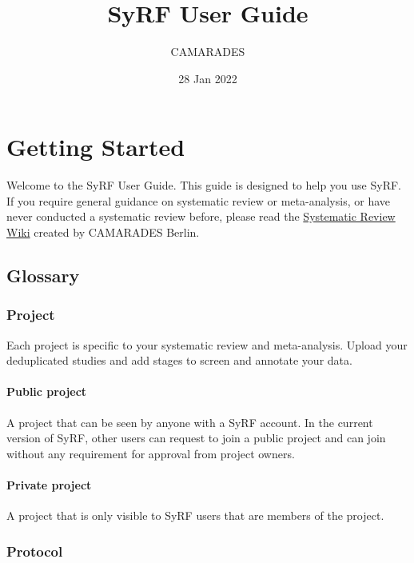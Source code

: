 \documentclass[
]{book}
\title{SyRF User Guide}
\author{CAMARADES}
\date{28 Jan 2022}
\begin{document}
\maketitle

{
\setcounter{tocdepth}{1}
\tableofcontents
}
\hypertarget{index}{%
\chapter{Getting Started}\label{index}}

Welcome to the SyRF User Guide. This guide is designed to help you use SyRF. If you require general guidance on systematic review or meta-analysis, or have never conducted a systematic review before, please read the \href{https://www.camarades.de/}{Systematic Review Wiki} created by CAMARADES Berlin.

\hypertarget{glossary}{%
\section{Glossary}\label{glossary}}

\hypertarget{project}{%
\subsection{Project}\label{project}}

Each project is specific to your systematic review and meta-analysis. Upload your deduplicated studies and add stages to screen and annotate your data.

\hypertarget{public-project}{%
\subsubsection{Public project}\label{public-project}}

A project that can be seen by anyone with a SyRF account. In the current version of SyRF, other users can request to join a public project and can join without any requirement for approval from project owners.

\hypertarget{private-project}{%
\subsubsection{Private project}\label{private-project}}

A project that is only visible to SyRF users that are members of the project.

\hypertarget{protocol}{%
\subsection{Protocol}\label{protocol}}
\end{document}
